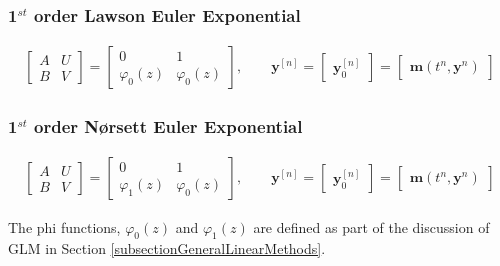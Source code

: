 \subsubsection{1$^{st}$ order Lawson Euler Exponential}
\begin{align*}
\left[\begin{array}{c|c}
A & U \\
\hline
B & V
\end{array}\right] =
\left[\begin{array}{c|c}
0 & 1 \\
\hline
\varphi_0(z) & \varphi_0(z)
\end{array}\right],\qquad
\boldsymbol{y}^{[n]}=
\left[\begin{array}{c}
\boldsymbol{y}^{[n]}_0
\end{array}\right]=
\left[\begin{array}{c}
\boldsymbol{m}\left(t^n,\boldsymbol{y}^{n}\right)
\end{array}\right]
\end{align*}

\subsubsection{1$^{st}$ order N{\o}rsett Euler Exponential}
\begin{align*}
\left[\begin{array}{c|c}
A & U \\
\hline
B & V
\end{array}\right] =
\left[\begin{array}{c|c}
0 & 1 \\
\hline
\varphi_1(z) & \varphi_0(z)
\end{array}\right],\qquad
\boldsymbol{y}^{[n]}=
\left[\begin{array}{c}
\boldsymbol{y}^{[n]}_0
\end{array}\right]=
\left[\begin{array}{c}
\boldsymbol{m}\left(t^n,\boldsymbol{y}^{n}\right)
\end{array}\right]
\end{align*}

\begin{notebox}
The phi functions, $\varphi_0(z)$ and $\varphi_1(z)$ are defined as
part of the discussion of GLM in Section \ref{subsectionGeneralLinearMethods}.
\end{notebox}
